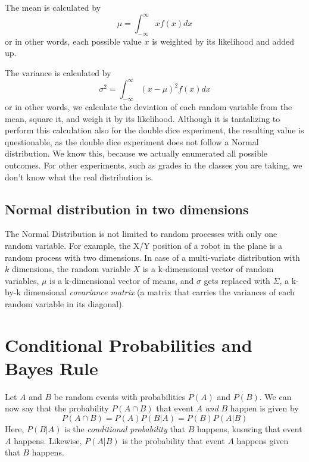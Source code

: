 The mean is calculated by
\begin{equation}
\mu=\int_{-\infty}^{\infty}xf(x)dx
\end{equation}
or in other words, each possible value $ x$ is weighted by its likelihood and added up.

The variance is calculated by
\begin{equation}
\sigma^2=\int_{-\infty}^{\infty}(x-\mu)^2f(x)dx
\end{equation}
or in other words, we calculate the deviation of each random variable from the mean, square it, and weigh it by its likelihood. Although it is tantalizing to perform this calculation also for the double dice experiment, the resulting value is questionable, as the double dice experiment does not follow a Normal distribution. We know this, because we actually enumerated all possible outcomes. For other experiments, such as grades in the classes you are taking, we don't know what the real distribution is.


\subsection{Normal distribution in two dimensions}
The Normal Distribution is not limited to random processes with only one random variable. For example, the X/Y position of a robot in the plane is a random process with two dimensions. In case of a multi-variate distribution with $k$ dimensions, the random variable $ X$ is a k-dimensional vector of random variables, $ \mu$ is a k-dimensional vector of means, and $ \sigma$ gets replaced with $ \Sigma$,  a k-by-k dimensional \emph{covariance matrix} (a matrix that carries the variances of each random variable in its diagonal).

\section{Conditional Probabilities and Bayes Rule}\label{sec:bayesrule}
Let $A$ and $B$ be random events with probabilities $P(A)$ and $P(B)$. We can now say that the probability $P(A \cap B)$ that event $A$ \emph{and} $B$ happen is given by
\begin{equation}\label{eq:conditionalprob}
P(A \cap B)=P(A)P(B|A)=P(B)P(A|B)
\end{equation}
Here, $P(B|A)$ is the \emph{conditional probability} that $B$ happens, knowing that event $A$ happens. Likewise, $P(A|B)$ is the probability that event $A$ happens given that $B$ happens.

